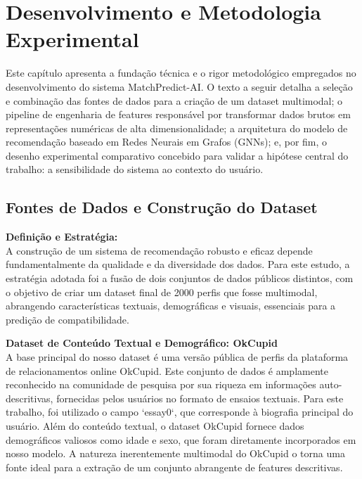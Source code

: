 \chapter{Desenvolvimento e Metodologia Experimental}
\label{chap:desenvolvimento}

Este capítulo apresenta a fundação técnica e o rigor metodológico empregados no desenvolvimento do sistema MatchPredict-AI. O texto a seguir detalha a seleção e combinação das fontes de dados para a criação de um dataset multimodal; o pipeline de engenharia de features responsável por transformar dados brutos em representações numéricas de alta dimensionalidade; a arquitetura do modelo de recomendação baseado em Redes Neurais em Grafos (GNNs); e, por fim, o desenho experimental comparativo concebido para validar a hipótese central do trabalho: a sensibilidade do sistema ao contexto do usuário.

\section{Fontes de Dados e Construção do Dataset}
\label{sec:fontes_dados}

\textbf{Definição e Estratégia:} \\
A construção de um sistema de recomendação robusto e eficaz depende fundamentalmente da qualidade e da diversidade dos dados. Para este estudo, a estratégia adotada foi a fusão de dois conjuntos de dados públicos distintos, com o objetivo de criar um dataset final de 2000 perfis que fosse multimodal, abrangendo características textuais, demográficas e visuais, essenciais para a predição de compatibilidade.

\textbf{Dataset de Conteúdo Textual e Demográfico: OkCupid} \\
A base principal do nosso dataset é uma versão pública de perfis da plataforma de relacionamentos online OkCupid. Este conjunto de dados é amplamente reconhecido na comunidade de pesquisa por sua riqueza em informações auto-descritivas, fornecidas pelos usuários no formato de ensaios textuais. Para este trabalho, foi utilizado o campo `essay0`, que corresponde à biografia principal do usuário. Além do conteúdo textual, o dataset OkCupid fornece dados demográficos valiosos como idade e sexo, que foram diretamente incorporados em nosso modelo. A natureza inerentemente multimodal do OkCupid o torna uma fonte ideal para a extração de um conjunto abrangente de features descritivas.

